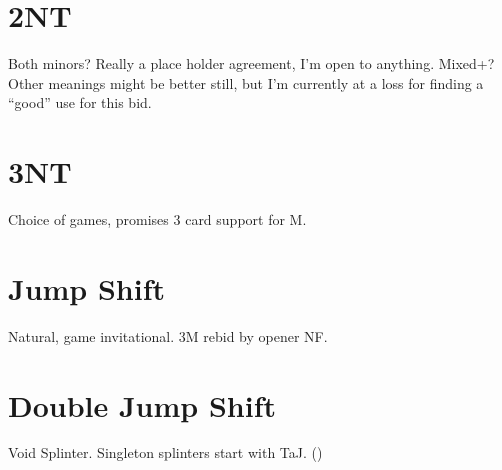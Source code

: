 \documentclass[tom-ari]{subfile}
\begin{document}
	
	\section{2NT}
	
	Both minors?  Really a place holder agreement, I'm open to anything. Mixed+? Other meanings might be better still, but I'm currently at a loss for finding a ``good'' use for this bid.
	
	\section{3NT}
	
	Choice of games, promises 3 card support for M.
	
	\section{Jump Shift}
	
	Natural, game invitational. 3M rebid by opener NF.
	
	\section{Double Jump Shift}
	
	Void Splinter. Singleton splinters start with TaJ. ()
		
\end{document}
